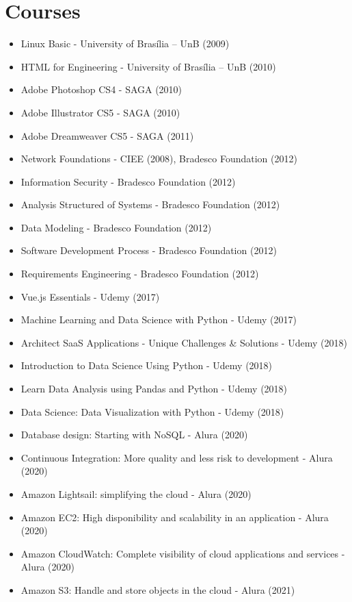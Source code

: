 \section{Courses}
\begin{itemize}
    \item Linux Basic - University of Brasília – UnB (2009)
    \item HTML for Engineering - University of Brasília – UnB (2010)
    \item Adobe Photoshop CS4 - SAGA (2010)
    \item Adobe Illustrator CS5 - SAGA (2010)
    \item Adobe Dreamweaver CS5 - SAGA (2011)
    \item Network Foundations - CIEE (2008), Bradesco Foundation (2012)
    \item Information Security - Bradesco Foundation (2012)
    \item Analysis Structured of Systems - Bradesco Foundation (2012)
    \item Data Modeling - Bradesco Foundation (2012)
    \item Software Development Process - Bradesco Foundation (2012)
    \item Requirements Engineering - Bradesco Foundation (2012)
    \item Vue.js Essentials - Udemy (2017)
    \item Machine Learning and Data Science with Python - Udemy (2017)
    \item Architect SaaS Applications - Unique Challenges & Solutions - Udemy (2018)
    \item Introduction to Data Science Using Python - Udemy (2018)
    \item Learn Data Analysis using Pandas and Python - Udemy (2018)
    \item Data Science: Data Visualization with Python - Udemy (2018)
    \item Database design: Starting with NoSQL - Alura (2020)
    \item Continuous Integration: More quality and less risk to development - Alura (2020)
    \item Amazon Lightsail: simplifying the cloud - Alura (2020)
    \item Amazon EC2: High disponibility and scalability in an application - Alura (2020)
    \item Amazon CloudWatch: Complete visibility of cloud applications and services - Alura (2020)
    \item Amazon S3: Handle and store objects in the cloud - Alura (2021)

\end{itemize}
